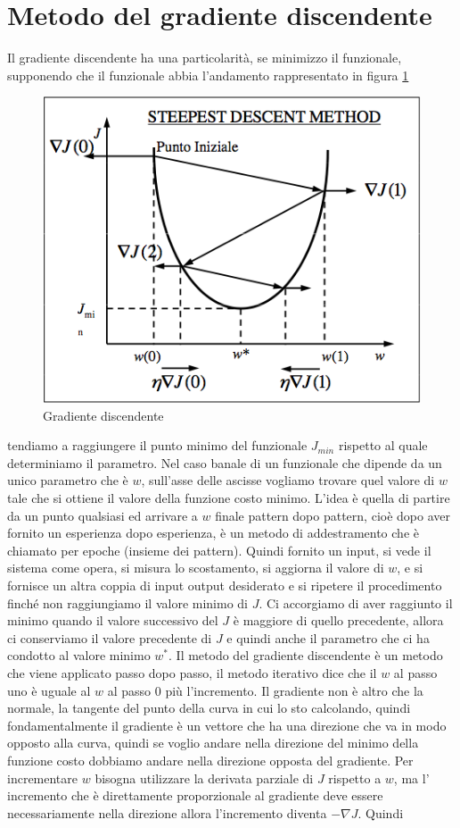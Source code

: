 \section{Metodo del gradiente discendente}
\noindent Il gradiente discendente ha una particolarità,  se minimizzo il funzionale, supponendo che il funzionale abbia l'andamento rappresentato in figura \ref{gradiente}
\begin{figure}
\centering
\includegraphics[scale=0.5]{img/gradiente.png}
\caption{Gradiente discendente}
\label{gradiente}
\end{figure}
tendiamo a raggiungere il punto minimo del funzionale $J_{min}$ rispetto al quale determiniamo il parametro.  Nel caso banale di un funzionale che dipende da un unico parametro che è $w$,  sull'asse delle ascisse vogliamo trovare quel valore di $w$ tale che si ottiene il valore della funzione costo minimo. L'idea è quella di partire da un punto qualsiasi ed arrivare a $w$ finale pattern dopo pattern, cioè dopo aver fornito un esperienza dopo esperienza, è un metodo di addestramento che è chiamato per epoche (insieme dei pattern). Quindi fornito un input, si vede il sistema come opera, si misura lo scostamento, si aggiorna il valore di $w$, e si fornisce un altra coppia di input output desiderato e si ripetere il procedimento finché non raggiungiamo il valore minimo di $J$. Ci accorgiamo di aver raggiunto il minimo quando il valore successivo del $J$ è maggiore di quello precedente, allora ci conserviamo il valore precedente di $J$ e quindi anche il parametro che ci ha condotto al valore minimo $w^*$. Il metodo del gradiente discendente è un metodo che viene applicato passo dopo passo, il metodo iterativo dice che il $w$ al passo uno è uguale al $w$ al passo 0 più l'incremento. Il gradiente non è altro che la normale, la tangente del punto della curva in cui lo sto calcolando, quindi fondamentalmente il gradiente è un vettore che ha una direzione che va in modo opposto alla curva, quindi se voglio andare nella direzione del minimo della funzione costo dobbiamo andare nella direzione opposta del gradiente. Per incrementare $w$ bisogna utilizzare la derivata parziale di $J$ rispetto a $w$,  ma l' incremento che è direttamente proporzionale al gradiente deve essere necessariamente nella direzione allora l'incremento diventa $-\nabla J$. Quindi
